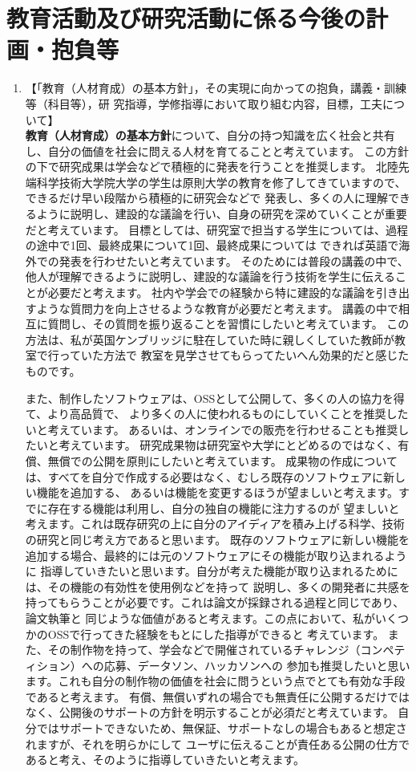 \documentclass[dvipdfmx]{jlreq}
\begin{document}
\section{教育活動及び研究活動に係る今後の計画・抱負等}

\begin{enumerate}
\item 【「教育（人材育成）の基本方針」，その実現に向かっての抱負，講義・訓練等（科目等），研
究指導，学修指導において取り組む内容，目標，工夫について】\\
\textbf{教育（人材育成）の基本方針}について、自分の持つ知識を広く社会と共有し、自分の価値を社会に問える人材を育てることと考えています。
この方針の下で研究成果は学会などで積極的に発表を行うことを推奨します。
北陸先端科学技術大学院大学の学生は原則大学の教育を修了してきていますので、できるだけ早い段階から積極的に研究会などで
発表し、多くの人に理解できるように説明し、建設的な議論を行い、自身の研究を深めていくことが重要だと考えています。
目標としては、研究室で担当する学生については、過程の途中で1回、最終成果について1回、最終成果については
できれば英語で海外での発表を行わせたいと考えています。
そのためには普段の講義の中で、他人が理解できるように説明し、建設的な議論を行う技術を学生に伝えることが必要だと考えます。
社内や学会での経験から特に建設的な議論を引き出すような質問力を向上させるような教育が必要だと考えます。
講義の中で相互に質問し、その質問を振り返ることを習慣にしたいと考えています。
この方法は、私が英国ケンブリッジに駐在していた時に親しくしていた教師が教室で行っていた方法で
教室を見学させてもらってたいへん効果的だと感じたものです。

また、制作したソフトウェアは、OSSとして公開して、多くの人の協力を得て、より高品質で、
より多くの人に使われるものにしていくことを推奨したいと考えています。
あるいは、オンラインでの販売を行わせることも推奨したいと考えています。
研究成果物は研究室や大学にとどめるのではなく、有償、無償での公開を原則にしたいと考えています。
成果物の作成については、すべてを自分で作成する必要はなく、むしろ既存のソフトウェアに新しい機能を追加する、
あるいは機能を変更するほうが望ましいと考えます。すでに存在する機能は利用し、自分の独自の機能に注力するのが
望ましいと考えます。これは既存研究の上に自分のアイディアを積み上げる科学、技術の研究と同じ考え方であると思います。
既存のソフトウェアに新しい機能を追加する場合、最終的には元のソフトウェアにその機能が取り込まれるように
指導していきたいと思います。自分が考えた機能が取り込まれるためには、その機能の有効性を使用例などを持って
説明し、多くの開発者に共感を持ってもらうことが必要です。これは論文が採録される過程と同じであり、論文執筆と
同じような価値があると考えます。この点において、私がいくつかのOSSで行ってきた経験をもとにした指導ができると
考えています。
また、その制作物を持って、学会などで開催されているチャレンジ（コンペティション）への応募、データソン、ハッカソンへの
参加も推奨したいと思います。これも自分の制作物の価値を社会に問うという点でとても有効な手段であると考えます。
有償、無償いずれの場合でも無責任に公開するだけではなく、公開後のサポートの方針を明示することが必須だと考えています。
自分ではサポートできないため、無保証、サポートなしの場合もあると想定されますが、それを明らかにして
ユーザに伝えることが責任ある公開の仕方であると考え、そのように指導していきたいと考えます。


\end{enumerate}
\end{document}
